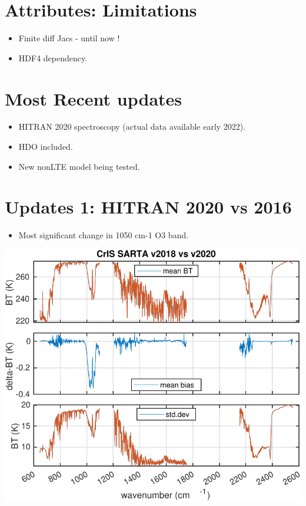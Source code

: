 \documentclass[10pt,t]{article}
\begin{document}
\section{Attributes: Limitations}
\label{sec:org40bf8bc}
\begin{itemize}
\item Finite diff Jacs - until now !
\item HDF4 dependency.
\end{itemize}

\section{Most Recent updates}
\label{sec:orgd1faf21}
\begin{itemize}
\item HITRAN 2020 spectroscopy (actual data available early 2022).
\item HDO included.
\item New nonLTE model being tested.
\end{itemize}


\section{Updates 1: HITRAN 2020 vs 2016}
\label{sec:org4e51110}
\begin{itemize}
\item Most significant change in 1050 cm-1 O3 band.
\end{itemize}
\begin{center}
\includegraphics[width=.9\linewidth]{./Figs/sarta_cris_hr_h2018_vs_h2020_r49_686_mn_stdaslp.pdf}
\end{center}
\end{document}
